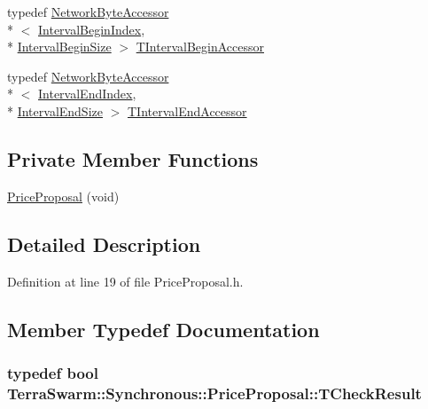 \begin{DoxyCompactItemize}
\item 
typedef \hyperlink{class_terra_swarm_1_1_network_byte_accessor}{Network\-Byte\-Accessor}\\*
$<$ \hyperlink{class_terra_swarm_1_1_synchronous_1_1_price_proposal_a32c76156dee2511c9aa14a90995639c8abadfb7fce0950c70240c2687de80a253}{Interval\-Begin\-Index}, \\*
\hyperlink{class_terra_swarm_1_1_synchronous_1_1_price_proposal_ab2ea7dd828cca1f7635018608f595f0ba2482e22b3b67744f6bb178b36cdc1b91}{Interval\-Begin\-Size} $>$ \hyperlink{class_terra_swarm_1_1_synchronous_1_1_price_proposal_a4a52f34f0b7c60bfc0ca8656cd9c3c5d}{T\-Interval\-Begin\-Accessor}
\item 
typedef \hyperlink{class_terra_swarm_1_1_network_byte_accessor}{Network\-Byte\-Accessor}\\*
$<$ \hyperlink{class_terra_swarm_1_1_synchronous_1_1_price_proposal_a32c76156dee2511c9aa14a90995639c8abbbf6c709acc6b1a4b2cf07f3145bccf}{Interval\-End\-Index}, \\*
\hyperlink{class_terra_swarm_1_1_synchronous_1_1_price_proposal_ab2ea7dd828cca1f7635018608f595f0ba1481cf2a5350361d2fbc2f166ede8c19}{Interval\-End\-Size} $>$ \hyperlink{class_terra_swarm_1_1_synchronous_1_1_price_proposal_ad36cac35c047c96d50ecfb29504e9fd6}{T\-Interval\-End\-Accessor}
\end{DoxyCompactItemize}
\subsection*{Private Member Functions}
\begin{DoxyCompactItemize}
\item 
\hyperlink{class_terra_swarm_1_1_synchronous_1_1_price_proposal_a463100bd56cb523af80b7e35e1d2dbe5}{Price\-Proposal} (void)
\end{DoxyCompactItemize}


\subsection{Detailed Description}


Definition at line 19 of file Price\-Proposal.\-h.



\subsection{Member Typedef Documentation}
\hypertarget{class_terra_swarm_1_1_synchronous_1_1_price_proposal_ab5aef6a74a44439eb880f7dbff610b57}{
\subsubsection[{T\-Check\-Result}]{\setlength{\rightskip}{0pt plus 5cm}typedef bool {\bf Terra\-Swarm\-::\-Synchronous\-::\-Price\-Proposal\-::\-T\-Check\-Result}}}\label{class_terra_swarm_1_1_synchronous_1_1_price_proposal_ab5aef6a74a44439eb880f7dbff610b57}


